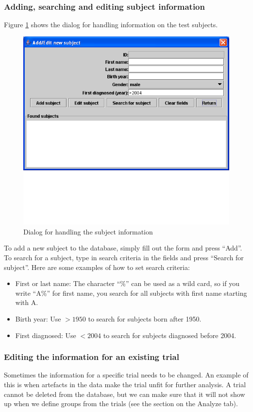 \documentclass[a4paper,11pt]{article}
\begin{document}
\subsubsection{Adding, searching and editing subject information}
Figure \ref{fig:subjectgui} shows the dialog for handling information on the test subjects.
  \begin{figure}[htbp]	
    \centering	
    \includegraphics[width=140mm]{figures/subjectgui.png}
    \caption{Dialog for handling the subject information}
    \label{fig:subjectgui}
  \end{figure}
To add a new subject to the database, simply fill out the form and
press ``Add''. To search for a subject, type in search criteria in the
fields and press ``Search for subject''. Here are some examples of how
to set search criteria:
\begin{itemize}
\item First or last name: The character ``\%'' can be used as a wild
card, so if you write ``A\%'' for first name, you search for all
subjects with first name starting with A.
\item Birth year: Use $>1950$ to search for subjects born after 1950.
\item First diagnosed: Use $<2004$ to search for subjects diagnosed
before 2004.
\end{itemize}

\subsubsection{Editing the information for an existing trial}
Sometimes the information for a specific trial needs to be
changed. An example of this is when artefacts in the data make the
trial unfit for further analysis. A trial cannot be deleted from the
database, but we can make sure that it will not show up when we define
groups from the trials (see the section on the Analyze tab). 
\end{document}
